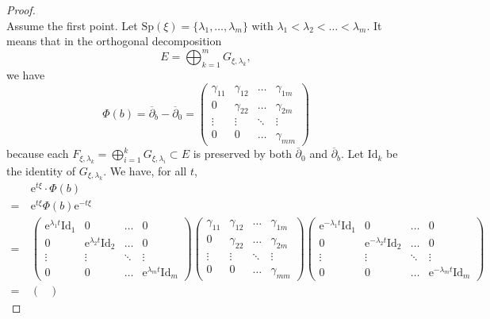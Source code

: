 \documentclass[10pt,a4paper]{amsart}
\newcommand{\Id}{\mathrm{Id}}
\newcommand{\dbar}{\overline{\partial}}
\newcommand{\e}{\boldsymbol{\mathrm{e}}}
\begin{document}
\begin{proof}\ \\
\noindent{} Assume the first point. Let $\mathrm{Sp}(\xi) = \{\lambda_1,\ldots,\lambda_m\}$ with $\lambda_1 < \lambda_2 < \ldots < \lambda_m$. It means that in the orthogonal decomposition
$$
E = \bigoplus_{k = 1}^m G_{\xi,\lambda_k},
$$
we have
$$
\Phi(b) = \dbar_b - \dbar_0 =
\begin{pmatrix}
    \gamma_{11} & \gamma_{12} & \hdots & \gamma_{1m}\\
    0 & \gamma_{22} & \hdots & \gamma_{2m}\\
    \vdots & \vdots & \ddots & \vdots\\
    0 & 0 & \hdots & \gamma_{mm}
\end{pmatrix}
$$
because each $F_{\xi,\lambda_k} = \bigoplus_{i = 1}^k G_{\xi,\lambda_i} \subset E$ is preserved by both $\dbar_0$ and $\dbar_b$. Let $\Id_k$ be the identity of $G_{\xi,\lambda_k}$. We have, for all $t$,
\begin{align*}
    &\e^{t\xi} \cdot \Phi(b)\\
    =\ & \e^{t\xi}\Phi(b)\e^{-t\xi}\\
    =\ &
    \begin{pmatrix}
        \e^{\lambda_1t}\Id_1 & 0 & \hdots & 0\\
        0 & \e^{\lambda_2t}\Id_2 & \hdots & 0\\
        \vdots & \vdots & \ddots & \vdots\\
        0 & 0 & \hdots & \e^{\lambda_mt}\Id_m
    \end{pmatrix}
    \begin{pmatrix}
        \gamma_{11} & \gamma_{12} & \hdots & \gamma_{1m}\\
        0 & \gamma_{22} & \hdots & \gamma_{2m}\\
        \vdots & \vdots & \ddots & \vdots\\
        0 & 0 & \hdots & \gamma_{mm}
    \end{pmatrix}
    \begin{pmatrix}
        \e^{-\lambda_1t}\Id_1 & 0 & \hdots & 0\\
        0 & \e^{-\lambda_2t}\Id_2 & \hdots & 0\\
        \vdots & \vdots & \ddots & \vdots\\
        0 & 0 & \hdots & \e^{-\lambda_mt}\Id_m
    \end{pmatrix}\\
    =\ &
    \begin{pmatrix}

\end{pmatrix}
\end{align*}
\end{proof}
\end{document}

